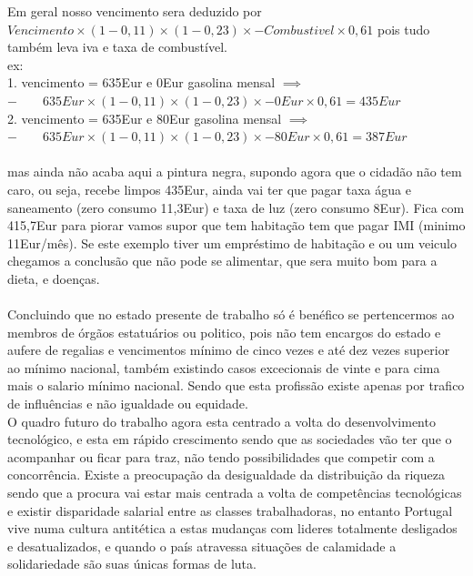 Em geral nosso vencimento sera deduzido por $Vencimento \times (1-0,11) \times (1-0,23) \times - Combustivel\times 0,61$ pois tudo também leva iva e taxa de combustível.\\
ex:\\
1. vencimento = 635Eur e 0Eur gasolina mensal $\implies$ \\
$- \qquad 635Eur \times (1-0,11) \times (1-0,23) \times - 0Eur \times 0,61 = 435Eur$ \\
2. vencimento = 635Eur e 80Eur gasolina mensal $\implies$ \\
$- \qquad 635Eur \times (1-0,11) \times (1-0,23) \times - 80Eur \times 0,61 = 387Eur$ \\ \\
mas ainda não acaba aqui a pintura negra, supondo agora que o cidadão não tem caro, ou seja, recebe limpos 435Eur, ainda vai ter que pagar taxa água e saneamento (zero consumo 11,3Eur) e taxa de luz (zero consumo 8Eur). Fica com 415,7Eur para piorar vamos supor que tem habitação tem que pagar IMI (minimo 11Eur/mês).
Se este exemplo tiver um empréstimo de habitação e ou um veiculo chegamos a conclusão que não pode se alimentar, que sera muito bom para a dieta, e doenças.\\ \\
Concluindo que no estado presente de trabalho só é benéfico se pertencermos ao membros de órgãos estatuários ou politico, pois não tem encargos do estado e aufere de regalias e vencimentos mínimo de cinco vezes e até dez vezes superior ao mínimo nacional, também existindo casos excecionais de vinte e para cima mais o salario mínimo nacional. Sendo que esta profissão existe apenas por trafico de influências e não igualdade ou equidade.\\


O quadro futuro do trabalho agora esta centrado a volta do desenvolvimento tecnológico, e esta em rápido crescimento sendo que as sociedades vão ter que o acompanhar ou ficar para traz, não tendo possibilidades que competir com a concorrência. Existe a preocupação da desigualdade da distribuição da riqueza sendo que a procura vai estar mais centrada a volta de competências tecnológicas e existir disparidade salarial entre as classes trabalhadoras, no entanto Portugal vive numa cultura antitética a estas mudanças com lideres totalmente desligados e desatualizados, e quando o país atravessa situações de calamidade a solidariedade são suas únicas formas de luta.
















